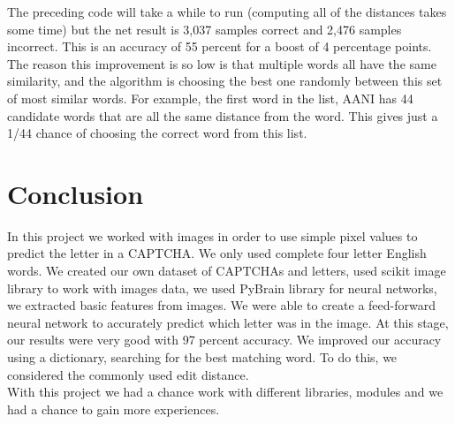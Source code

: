 \documentclass[onecolumn]{article}
\begin{document}
\newpage
\begin{t}
The preceding code will take a while to run (computing all of the distances takes
some time) but the net result is 3,037 samples correct and 2,476 samples incorrect.
This is an accuracy of 55 percent for a boost of 4 percentage points. The reason this
improvement is so low is that multiple words all have the same similarity, and the
algorithm is choosing the best one randomly between this set of most similar words.
For example, the first word in the list, AANI has 44 candidate words that
are all the same distance from the word. This gives just a 1/44 chance of choosing
the correct word from this list.
\end{t}

\section{Conclusion}
In this project we worked with images in order to use simple pixel values to
predict the letter in a CAPTCHA. We only used complete four letter English words. We created our own dataset of CAPTCHAs and letters, used scikit image library to work with images data, we used PyBrain library for neural networks, we extracted basic features from images. We were able to create a feed-forward neural network to accurately predict which letter was in the image. At this stage, our results were very good with 97 percent accuracy. We improved our accuracy using a dictionary, searching for the best matching word. To do this, we considered the commonly used edit distance.\\
With this project we had a chance work with different libraries, modules and we had a chance to gain more experiences. 
\end{document}
